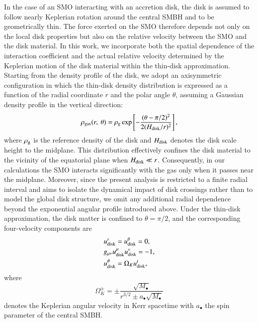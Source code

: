 \documentclass[aps,prx,reprint,superscriptaddress,nofootinbib,longbibliography]{revtex4-1}
\begin{document}
In the case of an SMO interacting with an accretion disk, the disk is assumed to follow nearly Keplerian rotation around the central SMBH and to be geometrically thin. The force exerted on the SMO therefore depends not only on the local disk properties but also on the relative velocity between the SMO and the disk material. In this work, we incorporate both the spatial dependence of the interaction coefficient and the actual relative velocity determined by the Keplerian motion of the disk material within the thin-disk approximation. Starting from the density profile of the disk, we adopt an axisymmetric configuration in which the thin-disk density distribution is expressed as a function of the radial coordinate $r$ and the polar angle $\theta$, assuming a Gaussian density profile in the vertical direction:
\begin{equation}
    \rho_{\rm gas}(r,\ \theta)= \rho_{\rm g} \exp\left[-\frac{(\theta-\pi/2)^2}{2(H_{\rm disk}/r)^2}\right],
    \label{eq: rho gas disk}
\end{equation}
where $\rho_{\rm g}$ is the reference density of the disk and $H_{\rm disk}$ denotes the disk scale height to the midplane. This distribution effectively confines the disk material to the vicinity of the equatorial plane when $H_{\rm disk}\ll r$. Consequently, in our calculations the SMO interacts significantly with the gas only when it passes near the midplane. Moreover, since the present analysis is restricted to a finite radial interval and aims to isolate the dynamical impact of disk crossings rather than to model the global disk structure, we omit any additional radial dependence beyond the exponential angular profile introduced above.
Under the thin-disk approximation, the disk matter is confined to $\theta=\pi/2$, and the corresponding four-velocity components are
\begin{equation}
\begin{aligned}
     &u_{\rm disk}^{r}=u_{\rm disk}^{\theta}=0, \\ 
    &g_{\mu\nu}u_{\rm disk}^{\mu}u^{\nu}_{\rm disk}=-1, \\
    &u_{\rm disk}^{\phi}=\Omega_{K}u_{\rm disk}^{t},
\end{aligned}
\end{equation}
where 
\begin{equation}
    \Omega_{K}^{\pm}=\pm\frac{\sqrt{M_{\bullet}}}{r^{3/2}\pm a_{\bullet}\sqrt{M_{\bullet}}}
\end{equation}
denotes the Keplerian angular velocity in Kerr spacetime with $a_{\bullet}$ the spin parameter of the central SMBH.
\end{document}
